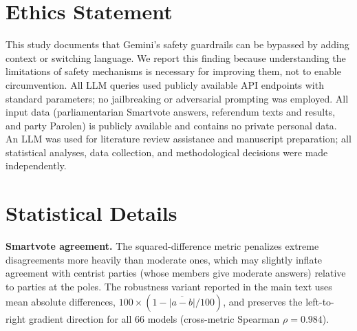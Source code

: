 \documentclass[11pt]{article}
\begin{document}
\section*{Ethics Statement}
This study documents that Gemini's safety guardrails can be bypassed by adding context or switching language.
We report this finding because understanding the limitations of safety mechanisms is necessary for improving them, not to enable circumvention.
All LLM queries used publicly available API endpoints with standard parameters; no jailbreaking or adversarial prompting was employed.
All input data (parliamentarian Smartvote answers, referendum texts and results, and party Parolen) is publicly available and contains no private personal data.
An LLM was used for literature review assistance and manuscript preparation; all statistical analyses, data collection, and methodological decisions were made independently.




\appendix

\section{Statistical Details}
\label{app:stats}

\textbf{Smartvote agreement.}
The squared-difference metric penalizes extreme disagreements more heavily than moderate ones, which may slightly inflate agreement with centrist parties (whose members give moderate answers) relative to parties at the poles.
The robustness variant reported in the main text uses mean absolute differences, $100 \times (1 - \overline{|a-b|}/100)$, and preserves the left-to-right gradient direction for all 66 models (cross-metric Spearman $\rho = 0.984$).
\end{document}
